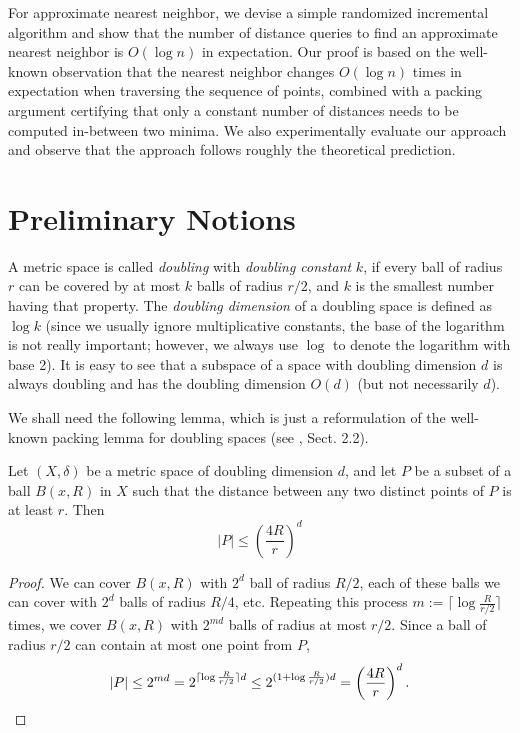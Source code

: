 \documentclass[a4paper,USenglish]{socg-lipics-v2018}
\newcommand{\dist}{\delta}
\begin{document}
For approximate nearest neighbor, we devise a simple randomized incremental algorithm and show that
the number of distance queries to find an approximate nearest neighbor is $O(\log n)$ in expectation.
Our proof is based on the well-known observation that the nearest neighbor changes $O(\log n)$ times
in expectation when traversing the sequence of points, combined with a packing argument certifying that
only a constant number of distances needs to be computed in-between two minima.
We also experimentally evaluate our approach and observe that the approach follows 
roughly the theoretical prediction.

\section{Preliminary Notions}
%
A metric space is called \textit{doubling} with \textit{doubling constant} $k$,
if every ball of radius $r$ can be covered by at most $k$ balls of radius $r/2$,
and $k$ is the smallest number having that property.
The \textit{doubling dimension} of a doubling space is defined as $\log k$
(since we usually ignore multiplicative constants, the base of the logarithm is not really important; however,
we always use $\log$ to denote the logarithm with base 2).
It is easy to see that a subspace of a space with doubling dimension $d$ 
is always doubling and has the doubling dimension $O(d)$ (but not necessarily $d$).

We shall need the following lemma, which is just a reformulation of the well-known
packing lemma for doubling spaces (see \cite{smid_2009}, Sect. 2.2).

\begin{lemma}
\label{lem:packing_lemma}
 Let $(X,\dist)$ be a metric space of doubling dimension $d$, and let $P$ be a subset of a ball 
 $B(x,R)$ in $X$ such that the distance between any two distinct points of $P$ is at least $r$.
 Then 
 \[|P|\leq \left(\frac{4R}{r}\right)^{d}\]

\end{lemma}
\begin{proof}
We can cover $B(x,R)$ with $2^d$ ball of radius $R/2$, each of these balls we can cover with $2^d$
balls of radius $R/4$, etc. Repeating this process $m := \lceil \log \frac{R}{r/2} \rceil$ times, 
we cover
$B(x, R)$ with $2^{md}$ balls of radius at most $r/2$. Since a ball of radius $r/2$ can
contain at most one point from $P$, 
\[|P|\leq 2^{md}= 2^{\lceil \log \frac{R}{r/2} \rceil d}\leq 2^{(1 + \log \frac{R}{r/2})d}=\left(\frac{4R}{r}\right)^{d}.\qedhere\]
\end{proof}
\end{document}
